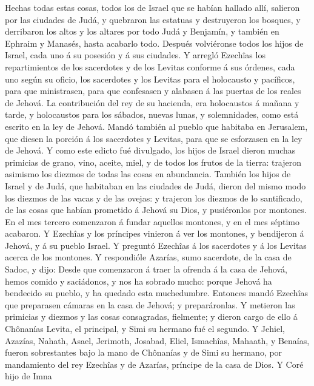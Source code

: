  Hechas todas estas cosas, todos los de Israel que se habían
hallado allí, salieron por las ciudades de Judá, y quebraron las
estatuas y destruyeron los bosques, y derribaron los altos y los altares
por todo Judá y Benjamín, y también en Ephraim y Manasés, hasta acabarlo
todo. Después volviéronse todos los hijos de Israel, cada uno á su
posesión y á sus ciudades.  Y arregló Ezechîas los
repartimientos de los sacerdotes y de los Levitas conforme á sus
órdenes, cada uno según su oficio, los sacerdotes y los Levitas para el
holocausto y pacíficos, para que ministrasen, para que confesasen y
alabasen á las puertas de los reales de Jehová.  La
contribución del rey de su hacienda, era holocaustos á mañana y tarde, y
holocaustos para los sábados, nuevas lunas, y solemnidades, como está
escrito en la ley de Jehová.  Mandó también al pueblo que
habitaba en Jerusalem, que diesen la porción á los sacerdotes y Levitas,
para que se esforzasen en la ley de Jehová.  Y como este
edicto fué divulgado, los hijos de Israel dieron muchas primicias de
grano, vino, aceite, miel, y de todos los frutos de la tierra: trajeron
asimismo los diezmos de todas las cosas en abundancia. 
También los hijos de Israel y de Judá, que habitaban en las ciudades de
Judá, dieron del mismo modo los diezmos de las vacas y de las ovejas: y
trajeron los diezmos de lo santificado, de las cosas que habían
prometido á Jehová su Dios, y pusiéronlos por montones.  En
el mes tercero comenzaron á fundar aquellos montones, y en el mes
séptimo acabaron.  Y Ezechîas y los príncipes vinieron á ver
los montones, y bendijeron á Jehová, y á su pueblo Israel. 
Y preguntó Ezechîas á los sacerdotes y á los Levitas acerca de los
montones.  Y respondióle Azarías, sumo sacerdote, de la
casa de Sadoc, y dijo: Desde que comenzaron á traer la ofrenda á la casa
de Jehová, hemos comido y saciádonos, y nos ha sobrado mucho: porque
Jehová ha bendecido su pueblo, y ha quedado esta muchedumbre.
 Entonces mandó Ezechîas que preparasen cámaras en la casa
de Jehová; y preparáronlas.  Y metieron las primicias y
diezmos y las cosas consagradas, fielmente; y dieron cargo de ello á
Chônanías Levita, el principal, y Simi su hermano fué el segundo.
 Y Jehiel, Azazías, Nahath, Asael, Jerimoth, Josabad,
Eliel, Ismachîas, Mahaath, y Benaías, fueron sobrestantes bajo la mano
de Chônanías y de Simi su hermano, por mandamiento del rey Ezechîas y de
Azarías, príncipe de la casa de Dios.  Y Coré hijo de Imna
